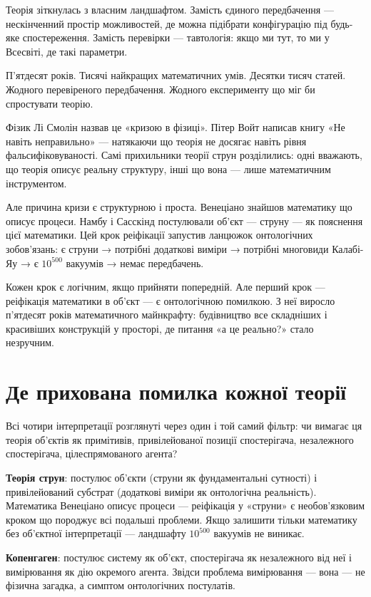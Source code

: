 \documentclass[12pt, a4paper, openany]{book}
\begin{document}
Теорія зіткнулась з власним ландшафтом. Замість єдиного передбачення — нескінченний простір можливостей, де можна підібрати конфігурацію під будь-яке спостереження. Замість перевірки — тавтологія: якщо ми тут, то ми у Всесвіті, де такі параметри.

П'ятдесят років. Тисячі найкращих математичних умів. Десятки тисяч статей. Жодного перевіреного передбачення. Жодного експерименту що міг би спростувати теорію.

Фізик Лі Смолін назвав це «кризою в фізиці». Пітер Войт написав книгу «Не навіть неправильно» — натякаючи що теорія не досягає навіть рівня фальсифіковуваності. Самі прихильники теорії струн розділились: одні вважають, що теорія описує реальну структуру, інші що вона — лише математичним інструментом.

Але причина кризи є структурною і проста. Венеціано знайшов математику що описує процеси. Намбу і Сасскінд постулювали об'єкт — струну — як пояснення цієї математики. Цей крок реіфікації запустив ланцюжок онтологічних зобов'язань: є струни → потрібні додаткові виміри → потрібні многовиди Калабі-Яу → є $10^{500}$ вакуумів → немає передбачень.

Кожен крок є логічним, якщо прийняти попередній. Але перший крок — реіфікація математики в об'єкт — є онтологічною помилкою. З неї виросло п'ятдесят років математичного майнкрафту: будівництво все складніших і красивіших конструкцій у просторі, де питання «а це реально?» стало незручним.

\section{Де прихована помилка кожної теорії}

Всі чотири інтерпретації розглянуті через один і той самий фільтр: чи вимагає ця теорія об'єктів як примітивів, привілейованої позиції спостерігача, незалежного спостерігача, цілеспрямованого агента?

\textbf{Теорія струн}: постулює об'єкти (струни як фундаментальні сутності) і привілейований субстрат (додаткові виміри як онтологічна реальність). Математика Венеціано описує процеси — реіфікація у «струни» є необов'язковим кроком що породжує всі подальші проблеми. Якщо залишити тільки математику без об'єктної інтерпретації — ландшафту $10^{500}$ вакуумів не виникає.

\textbf{Копенгаген}: постулює систему як об'єкт, спостерігача як незалежного від неї і вимірювання як дію окремого агента. Звідси проблема вимірювання — вона — не фізична загадка, а симптом онтологічних постулатів.
\end{document}
